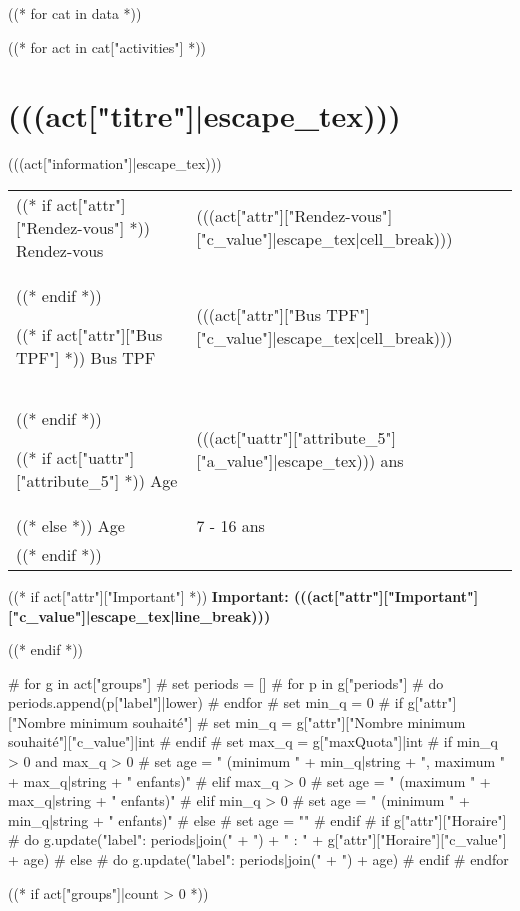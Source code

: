 \documentclass [parskip=full, paper=a4paper]{scrbook}
\begin{document}
\mainmatter

((* for cat in data *))

((* for act in cat["activities"] *))
\newpage

\section*{(((act["titre"]|escape_tex)))}

(((act["information"]|escape_tex)))
\medskip

\begin{tabulary}{0.9\textwidth}{p{2.5cm}|L}

((* if act["attr"]["Rendez-vous"] *))
Rendez-vous & (((act["attr"]["Rendez-vous"]["c_value"]|escape_tex|cell_break))) \\
((* endif *))

((* if act["attr"]["Bus TPF"] *))
Bus TPF & (((act["attr"]["Bus TPF"]["c_value"]|escape_tex|cell_break))) \\
((* endif *))

((* if act["uattr"]["attribute_5"] *))
Age & (((act["uattr"]["attribute_5"]["a_value"]|escape_tex))) ans \\
((* else *))
Age & 7 - 16 ans \\
((* endif *))

\end{tabulary}

((* if act["attr"]["Important"] *))
\medskip
\textbf{Important: (((act["attr"]["Important"]["c_value"]|escape_tex|line_break)))}

((* endif *))

# for g in act["groups"]
#   set periods = []
#   for p in g["periods"]
#     do periods.append(p["label"]|lower)
#   endfor
#   set min_q = 0
#   if g["attr"]["Nombre minimum souhaité"]
#     set min_q = g["attr"]["Nombre minimum souhaité"]["c_value"]|int
#   endif
#   set max_q = g["maxQuota"]|int
#   if min_q > 0 and max_q > 0
#     set age = " (minimum " + min_q|string + ", maximum " + max_q|string + " enfants)"
#   elif max_q > 0
#     set age = " (maximum " + max_q|string + " enfants)"
#   elif min_q > 0
#     set age = " (minimum " + min_q|string + " enfants)"
#   else
#     set age = ""
#   endif
#   if g["attr"]["Horaire"]
#     do g.update({"label": periods|join(" + ") + " : " + g["attr"]["Horaire"]["c_value"] + age})
#   else
#     do g.update({"label": periods|join(" + ") + age})
#   endif
# endfor

((* if act["groups"]|count > 0 *))
\medskip
\end{document}
